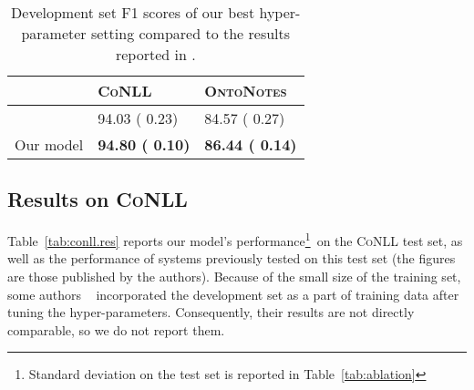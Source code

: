 \documentclass[11pt]{article}
\newcommand{\conll}{\textsc{CoNLL}}
\newcommand{\onto}{\textsc{OntoNotes}}
\begin{document}
	\begin{table}[h]
		\begin{center} 
			\begin{tabular}{|c|l|l|}
				\hline 
				& \textbf{\conll} & \textbf{\onto}\\
				\hline
				\cite{chiu2015named}  & 94.03 ( 0.23) & 84.57 ( 0.27)\\
				Our model & \bf 94.80 ( 0.10) & \bf 86.44 ( 0.14) \\
				\hline
			\end{tabular}
		\end{center}
		
		
		\caption{Development set F1 scores of our best hyper-parameter setting compared to the results reported in \cite{chiu2015named}.}
		\label{tab.dev} 
		
	\end{table}
	
	
	\subsection{Results on \conll}
	
	Table~\ref{tab:conll.res} reports our model's performance\footnote{Standard deviation on the test set is reported in Table~\ref{tab:ablation}} on the \conll{ }test set, as well as the performance of systems previously tested on this test set (the figures are those published by the authors). Because of the small size of the training set, some authors ~\cite{chiu2015named,yang2017neural,peters2017semi,peters2018deep} incorporated the development set as a part of training data after tuning the hyper-parameters. Consequently, their results are not directly comparable, so we do not report them.
	
\end{document}
